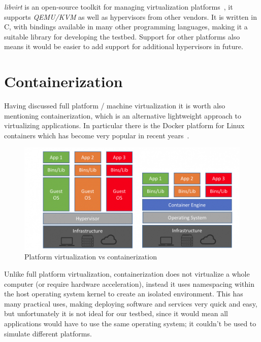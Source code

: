 \documentclass[
    author={Jacob Daniel Halsey},
    supervisor={Prof. Awais Rashid},
    degree={BSc},
    title={Building a Testbed for Evaluating Privacy Enhancing Technologies  (PETs)},
    subtitle={},
    type={software development},
    year={2021}
]{dissertation}
\begin{document}
\emph{libvirt} is an open-source toolkit for managing virtualization platforms~\cite{libvirt},
it supports \emph{QEMU/KVM} as well as hypervisors from other vendors. It is written in C, 
with bindings available in many other programming languages, making it a suitable library for developing 
the testbed. Support for other platforms also means it would be easier to add support
for additional hypervisors in future.

\section{Containerization}
\label{sect:containerization}

Having discussed full platform / machine virtualization it is worth also mentioning containerization,
which is an alternative lightweight approach to virtualizing applications. In particular 
there is the Docker platform for Linux containers which has become very popular in recent
years~\cite{zdnet_docker_2018}. \\

\begin{figure}
	\centering
	\includegraphics[width=12cm]{img/containers}
	\caption[]{Platform virtualization vs containerization\footnotemark}
	\label{containers_diagram}
\end{figure}

Unlike full platform virtualization, containerization does not virtualize a whole computer 
(or require hardware acceleration), instead it uses namespacing within the host operating 
system kernel to create an isolated environment. This has many practical uses, making deploying
software and services very quick and easy, but unfortunately it is not ideal for our testbed, since
it would mean all applications would have to use the same operating system; it couldn't be 
used to simulate different platforms. \\
\end{document}
